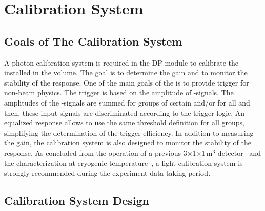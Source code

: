 \section{Calibration System}
\label{sec:dp-pds-calibration}

\subsection{Goals of The Calibration System}

A photon calibration system is required in the DP module to calibrate the  installed in the  volume. The goal is to determine the  gain and to monitor the stability of the  response. One of the main goals of the  is to provide trigger for non-beam physics. The trigger is based on the amplitude of -signals. The amplitudes of the -signals are summed for groups of certain  and/or for all  and then, these input signals are discriminated according to the trigger logic. An equalized  response allows to use the same threshold definition for all  groups, simplifying the determination of the trigger efficiency. In addition to measuring the  gain, the calibration system is also designed to monitor the stability of the  response.%
As concluded from the operation of a previous \num{3}$\times$\num{1}$\times$\num{1}\,m$^3$   detector~\cite{Aimard:2018yxp} and the  characterization at cryogenic temperature~\cite{Belver:2018erf}, a light calibration system is strongly recommended during the experiment data taking period.


\subsection{Calibration System Design}

